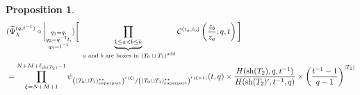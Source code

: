 \documentclass[12pt,reqno,a4paper]{amsart}
\newcommand{\comp}{\circ}
\newcommand{\cals}[1]{\mathcal{#1}}
\numberwithin{equation}{section}
\newtheorem{prop}[thm]{Proposition}
\theoremstyle{definition}
\begin{document}
\begin{prop}\mbox{}
\label{prp410-1703-25jul}
\footnotesize
\begin{align}
	&(
	\widetilde{\Psi}_{\lambda}^{(q,t^{-1})}
	\comp 
	\bigg|_{
		\substack{
			q_1 = q, \\
			q_2 = q^{-1}t,\\
			q_3 = t^{-1} \\
		}
	}
	)
	\bigg[
	\underbrace{	\prod_{1 \leq a < b \leq k}				}_{\text{ $a$ and $b$ are boxes in $(T_0 \sqcup T_1)^{\operatorname{add}}$}}
	\cals{C}^{(i_a,i_b)}\left(
	\frac{z_b}{z_a}
	; q, t
	\right)
	\bigg]
	\label{eqn323-2211-26jul}
	\\
	&= \prod_{\xi = N + M + 1}^{N + M + \ell_{\operatorname{sh}(T_2)} - 1}
	\psi_{\left(	(T_0 \sqcup T_1)^{\star\star}_{\operatorname{super part}}			\right)^{\prime \, (\xi)}/\left(	(T_0 \sqcup T_1)^{\star\star}_{\operatorname{super part}}			\right)^{\prime \, (\xi + 1)}}(t,q)
	\times 
	\frac{
		H(\operatorname{sh}(T_2),q,t^{-1})
	}{
		H(\operatorname{sh}(T_2)^\prime,t^{-1},q)
	}
	\times 
	\left(		\frac{t^{-1} - 1}{q - 1}			\right)^{|T_2|}
	\notag 
\end{align}
\normalsize
\end{prop}
\end{document}
